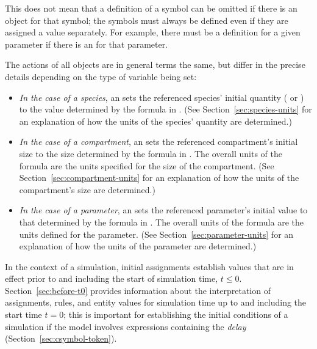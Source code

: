 This does not mean that a definition of a symbol can be omitted if
there is an \InitialAssignment object for that symbol; the symbols
must always be defined even if they are assigned a value
separately.  For example, there must be a \Parameter definition
for a given parameter if there is an \InitialAssignment for that
parameter.

The actions of all \InitialAssignment objects are in general terms
the same, but differ in the precise details depending on the type
of variable being set:
\begin{itemize}

\item \emph{In the case of a species}, an \InitialAssignment sets
  the referenced species' initial quantity
  ( or ) to
  the value determined by the formula in .  (See
  Section~\ref{sec:species-units} for an explanation of how the
  units of the species' quantity are determined.)

\item \emph{In the case of a compartment}, an \InitialAssignment
  sets the referenced compartment's initial size to the size
  determined by the formula in .  The overall units of
  the formula are the units specified for the size of the
  compartment.  (See Section~\ref{sec:compartment-units} for an
  explanation of how the units of the compartment's size are
  determined.)

\item \emph{In the case of a parameter}, an \InitialAssignment
  sets the referenced parameter's initial value to that determined
  by the formula in .  The overall units of the
  formula are the units defined for the parameter.  (See
  Section~\ref{sec:parameter-units} for an explanation of how the
  units of the parameter are determined.)

\end{itemize}

In the context of a simulation, initial assignments establish
values that are in effect prior to and including the start of
simulation time, \ie $t \leq 0$.  Section~\ref{sec:before-t0}
provides information about the interpretation of assignments,
rules, and entity values for simulation time up to and including
the start time $t = 0$; this is important for establishing the
initial conditions of a simulation if the model involves
expressions containing the \emph{delay} 
(Section~\ref{sec:csymbol-token}).


